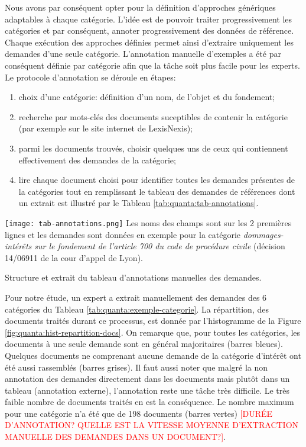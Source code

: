 Nous avons par conséquent opter pour la définition d'approches génériques adaptables à chaque catégorie. L'idée est de pouvoir  traiter progressivement les catégories et par conséquent, annoter progressivement des données de référence. Chaque exécution des approches définies permet ainsi d'extraire uniquement les demandes d'une seule catégorie. L'annotation manuelle d'exemples a été par conséquent définie par catégorie afin que la tâche soit plus facile pour les experts. Le protocole d'annotation se déroule en étapes: 
\begin{enumerate}
    \item choix d'une catégorie: définition d'un nom, de l'objet et du fondement;
    \item recherche par mots-clés des documents suceptibles de contenir la catégorie (par exemple sur le site internet de LexisNexis);
    \item parmi les documents trouvés, choisir quelques uns de ceux qui contiennent effectivement des demandes de la catégorie; 
    \item lire chaque document choisi pour identifier toutes les demandes présentes de la catégories tout en remplissant le tableau des demandes de références dont un extrait est illustré par le Tableau \ref{tab:quanta:tab-annotations}.
\end{enumerate}

\begin{table}[!htb]
\texttt{[image: tab-annotations.png]}
\scriptsize{Les noms des champs sont sur les 2 premières lignes et les demandes sont données en exemple pour la catégorie \textit{dommages-intérêts sur le fondement de l'article 700 du code de procédure civile} (décision 14/06911 de la cour d'appel de Lyon).}
\caption{Structure et extrait du tableau d'annotations manuelles des demandes.} \label{tab:quanta:tab-annotations}
\end{table}

Pour notre étude, un expert a extrait manuellement des demandes des 6 catégories du Tableau \ref{tab:quanta:exemple-categorie}. La répartition, des documents traités durant ce processus, est donnée par l'histogramme de la Figure \ref{fig:quanta:hist-repartition-docs}. On remarque que, pour toutes les catégories, les documents à une seule demande sont en général majoritaires (barres bleues). Quelques documents ne comprenant aucune demande de la catégorie d'intérêt ont été aussi rassemblés (barres grises). Il faut aussi noter que malgré la non annotation des demandes directement dans les documents mais plutôt dans un tableau (annotation externe), l'annotation reste une tâche très difficile. Le très faible nombre de documents traités en est la conséquence. Le nombre  maximum pour une catégorie n'a été que de 198 documents (barres vertes) \textcolor{red}{[DURÉE D'ANNOTATION? QUELLE EST LA VITESSE MOYENNE D'EXTRACTION MANUELLE DES DEMANDES DANS UN DOCUMENT?]}.

